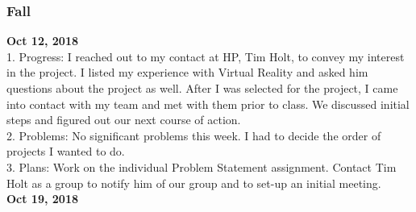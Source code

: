\subsubsection{Fall}

\textbf{Oct 12, 2018}\\
1. Progress: I reached out to my contact at HP, Tim Holt, to convey my interest in the project. I listed my experience with Virtual Reality and asked him questions about the project as well. After I was selected for the project, I came into contact with my team and met with them prior to class. We discussed initial steps and figured out our next course of action.
\\
2. Problems: No significant problems this week. I had to decide the order of projects I wanted to do. 
\\
3. Plans: Work on the individual Problem Statement assignment. Contact Tim Holt as a group to notify him of our group and to set-up an initial meeting.
\\
\textbf{Oct 19, 2018}\\


